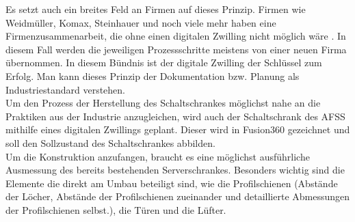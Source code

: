     Es setzt auch ein breites Feld an Firmen auf dieses Prinzip. Firmen wie Weidmüller, Komax, Steinhauer und noch viele mehr haben eine Firmenzusammenarbeit, die ohne einen digitalen Zwilling nicht möglich wäre \cite{smart_cabinet_building}. In diesem Fall werden die jeweiligen Prozessschritte meistens von einer neuen Firma übernommen. In diesem Bündnis ist der digitale Zwilling der Schlüssel zum Erfolg. Man kann dieses Prinzip der Dokumentation bzw. Planung als Industriestandard verstehen.\\
    Um den Prozess der Herstellung des Schaltschrankes möglichst nahe an die Praktiken aus der Industrie anzugleichen, wird auch der Schaltschrank des AFSS mithilfe eines digitalen Zwillings geplant. Dieser wird in Fusion360 gezeichnet und soll den Sollzustand des Schaltschrankes abbilden.\\
    Um die Konstruktion anzufangen, braucht es eine möglichst ausführliche Ausmessung des bereits bestehenden Serverschrankes. Besonders wichtig sind die Elemente die direkt am Umbau beteiligt sind, wie die Profilschienen (Abstände der Löcher, Abstände der Profilschienen zueinander und detaillierte Abmessungen der Profilschienen selbst.), die Türen und die Lüfter.\\
